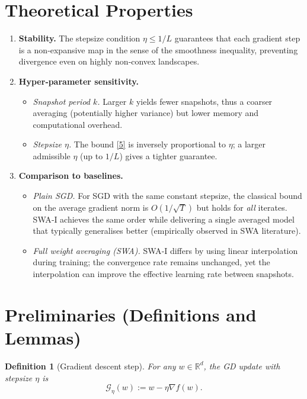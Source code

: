 \documentclass{article}
\newtheorem{definition}{Definition}
\begin{document}
\section*{Theoretical Properties}
\begin{enumerate}[label=\arabic*.]
\item \textbf{Stability.} The stepsize condition $\eta\le 1/L$ guarantees that each
gradient step is a non‑expansive map in the sense of the smoothness
inequality, preventing divergence even on highly non‑convex landscapes.
\item \textbf{Hyper‑parameter sensitivity.}
\begin{itemize}
\item \emph{Snapshot period $k$.} Larger $k$ yields fewer snapshots, thus a
coarser averaging (potentially higher variance) but lower memory and
computational overhead.
\item \emph{Stepsize $\eta$.} The bound \eqref{5} is inversely proportional to $\eta$;
a larger admissible $\eta$ (up to $1/L$) gives a tighter guarantee.
\end{itemize}
\item \textbf{Comparison to baselines.}
\begin{itemize}
\item \emph{Plain SGD.} For SGD with the same constant stepsize, the classical
bound on the average gradient norm is $O(1/\sqrt{T})$ but holds for \emph{all}
iterates.  SWA‑I achieves the same order while delivering a single
averaged model that typically generalises better (empirically observed in
SWA literature).
\item \emph{Full weight averaging (SWA).} SWA‑I differs by using linear
interpolation during training; the convergence rate remains unchanged,
yet the interpolation can improve the effective learning rate between
snapshots.
\end{itemize}
\end{enumerate}

\section*{Preliminaries (Definitions and Lemmas)}
\begin{definition}[Gradient descent step]
For any $w\in\mathbb{R}^{d}$, the GD update with stepsize $\eta$ is
\[
\mathcal{G}_{\eta}(w):=w-\eta\nabla f(w).
\tag{7}
\]
\end{definition}
\end{document}
